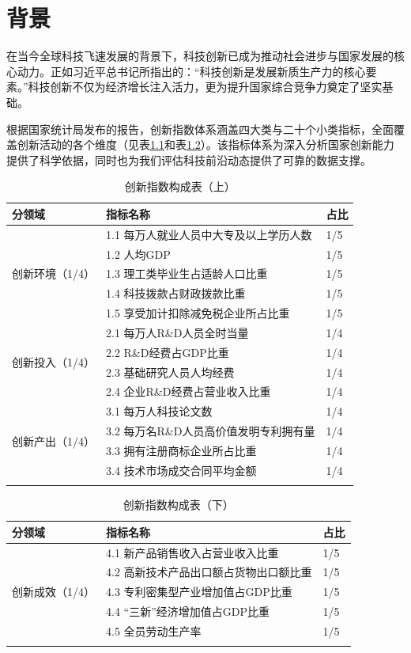 \chapter{背景}  
\label{chapter:introduction}  

在当今全球科技飞速发展的背景下，科技创新已成为推动社会进步与国家发展的核心动力。正如习近平总书记所指出的：“科技创新是发展新质生产力的核心要素。”科技创新不仅为经济增长注入活力，更为提升国家综合竞争力奠定了坚实基础。

根据国家统计局发布的报告，创新指数体系涵盖四大类与二十个小类指标，全面覆盖创新活动的各个维度（见表\ref{创新指数构成表_上}和表\ref{创新指数构成表_下}）。该指标体系为深入分析国家创新能力提供了科学依据，同时也为我们评估科技前沿动态提供了可靠的数据支撑。

\begin{table}[H]
\centering
\caption{创新指数构成表（上）}
\begin{tabular}{lll}
\toprule
\textbf{分领域} & \textbf{指标名称} & \textbf{占比} \\
\midrule
\multirow{5}{*}{创新环境（1/4）} 
    & 1.1 每万人就业人员中大专及以上学历人数 & 1/5 \\
    & 1.2 人均GDP & 1/5 \\
    & 1.3 理工类毕业生占适龄人口比重 & 1/5 \\
    & 1.4 科技拨款占财政拨款比重 & 1/5 \\
    & 1.5 享受加计扣除减免税企业所占比重 & 1/5 \\
\midrule
\multirow{4}{*}{创新投入（1/4）} 
    & 2.1 每万人R\&D人员全时当量 & 1/4 \\
    & 2.2 R\&D经费占GDP比重 & 1/4 \\
    & 2.3 基础研究人员人均经费 & 1/4 \\
    & 2.4 企业R\&D经费占营业收入比重 & 1/4 \\
\midrule
\multirow{4}{*}{创新产出（1/4）} 
    & 3.1 每万人科技论文数 & 1/4 \\
    & 3.2 每万名R\&D人员高价值发明专利拥有量 & 1/4 \\
    & 3.3 拥有注册商标企业所占比重 & 1/4 \\
    & 3.4 技术市场成交合同平均金额 & 1/4 \\
\bottomrule
\label{创新指数构成表_上}
\end{tabular}
\end{table}

\begin{table}[H]
\centering
\caption{创新指数构成表（下）}
\begin{tabular}{lll}
\toprule
\textbf{分领域} & \textbf{指标名称} & \textbf{占比} \\
\midrule
\multirow{5}{*}{创新成效（1/4）} 
    & 4.1 新产品销售收入占营业收入比重 & 1/5 \\
    & 4.2 高新技术产品出口额占货物出口额比重 & 1/5 \\
    & 4.3 专利密集型产业增加值占GDP比重 & 1/5 \\
    & 4.4 “三新”经济增加值占GDP比重 & 1/5 \\
    & 4.5 全员劳动生产率 & 1/5 \\
\bottomrule
\label{创新指数构成表_下}
\end{tabular}
\end{table}

